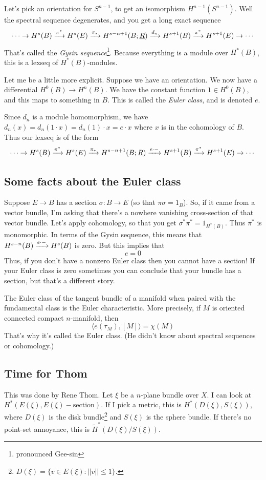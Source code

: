 Let's pick an orientation for $S^{n-1}$, to get an isomorphism $H^{n-1}(S^{n-1})$.
Well the spectral sequence degenerates, and you get a long exact sequence
$$
\cdots \to H^s(B) \xrightarrow{{\pi^\ast}} H^s(E) \xrightarrow{{\pi_\ast}} H^{s-n+1}(B;\underline{R}) \xrightarrow{{d_n}} H^{s+1}(B) \xrightarrow{{\pi^\ast}} H^{s+1}(E) \to \cdots
$$
That's called the \emph{Gysin sequence}\footnote{pronounced Gee-sin}.
Because everything is a module over $H^\ast(B)$, this is a lexseq of $H^\ast(B)$-modules.

Let me be a little more explicit.
Suppose we have an orientation.
We now have a differential $H^0(B) \to H^n(B)$.
We have the constant function $1\in H^0(B)$, and this maps to something in $B$.
This is called the \emph{Euler class}, and is denoted $e$.

Since $d_n$ is a module homomorphism, we have $d_n(x) = d_n(1\cdot x) = d_n(1) \cdot x = e \cdot x$ where $x$ is in the cohomology of $B$.
Thus our lexseq is of the form
$$
\cdots \to H^s(B) \xrightarrow{{\pi^\ast}} H^s(E) \xrightarrow{{\pi_\ast}} H^{s-n+1}(B;\underline{R}) \xrightarrow{{e\cdot - }} H^{s+1}(B) \xrightarrow{{\pi^\ast}} H^{s+1}(E) \to \cdots
$$
\subsection{Some facts about the Euler class}
Suppose $E\to B$ has a section $\sigma:B\to E$ (so that $\pi\sigma = 1_B$).
So, if it came from a vector bundle, I'm asking that there's a nowhere vanishing cross-section of that vector bundle.
Let's apply cohomology, so that you get $\sigma^\ast \pi^\ast = 1_{H^\ast(B)}$.
Thus $\pi^\ast$ is monomorphic.
In terms of the Gysin sequence, this means that $H^{s-n}(B)\xrightarrow{{e\cdot -}} H^s(B)$ is zero.
But this implies that
$$\boxed{e = 0}$$
Thus, if you don't have a nonzero Euler class then you cannot have a section!
If your Euler class is zero sometimes you can conclude that your bundle has a section, but that's a different story.

The Euler class of the tangent bundle of a manifold when paired with the fundamental class is the Euler characteristic.
More precisely, if $M$ is oriented connected compact $n$-manifold, then
$$
\langle e(\tau_M), [M] \rangle = \chi(M)
$$
That's why it's called the Euler class.
(He didn't know about spectral sequences or cohomology.)
\subsection{Time for Thom}
This was done by Rene Thom.
Let $\xi$ be a $n$-plane bundle over $X$.
I can look at $H^\ast(E(\xi), E(\xi) - \text{section})$.
If I pick a metric, this is $H^\ast(D(\xi), S(\xi))$, where $D(\xi)$ is the disk bundle\footnote{$D(\xi) = \{v\in E(\xi):||v||\leq 1\}$.} and $S(\xi)$ is the sphere bundle.
If there's no point-set annoyance, this is $\widetilde{H}^\ast(D(\xi)/S(\xi))$.

